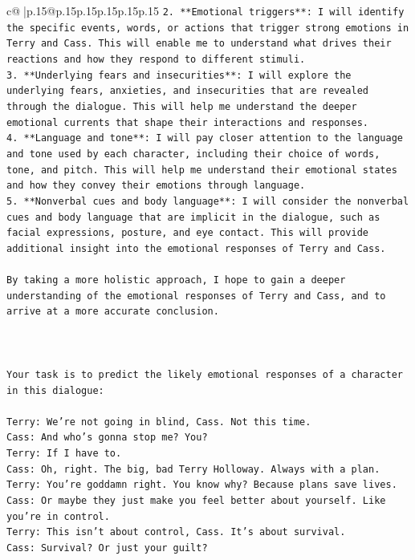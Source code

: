 \documentclass{article}
\begin{document}
{\begin{supertabular}{c@{$\;$}|p{.15\linewidth}@{}p{.15\linewidth}p{.15\linewidth}p{.15\linewidth}p{.15\linewidth}p{.15\linewidth}}
{{{\texttt{2. **Emotional triggers**: I will identify the specific events, words, or actions that trigger strong emotions in Terry and Cass. This will enable me to understand what drives their reactions and how they respond to different stimuli.} \\
\texttt{3. **Underlying fears and insecurities**: I will explore the underlying fears, anxieties, and insecurities that are revealed through the dialogue. This will help me understand the deeper emotional currents that shape their interactions and responses.} \\
\texttt{4. **Language and tone**: I will pay closer attention to the language and tone used by each character, including their choice of words, tone, and pitch. This will help me understand their emotional states and how they convey their emotions through language.} \\
\texttt{5. **Nonverbal cues and body language**: I will consider the nonverbal cues and body language that are implicit in the dialogue, such as facial expressions, posture, and eye contact. This will provide additional insight into the emotional responses of Terry and Cass.} \\
\\ 
\texttt{By taking a more holistic approach, I hope to gain a deeper understanding of the emotional responses of Terry and Cass, and to arrive at a more accurate conclusion.} \\
\\ 
\\ 
\\ 
\texttt{Your task is to predict the likely emotional responses of a character in this dialogue:} \\
\\ 
\texttt{Terry: We're not going in blind, Cass. Not this time.} \\
\texttt{Cass: And who's gonna stop me? You?} \\
\texttt{Terry: If I have to. } \\
\texttt{Cass: Oh, right. The big, bad Terry Holloway. Always with a plan. } \\
\texttt{Terry: You're goddamn right. You know why? Because plans save lives.} \\
\texttt{Cass: Or maybe they just make you feel better about yourself. Like you're in control.} \\
\texttt{Terry: This isn't about control, Cass. It's about survival. } \\
\texttt{Cass: Survival? Or just your guilt?} \\
}}}
\end{supertabular}}
\end{document}
